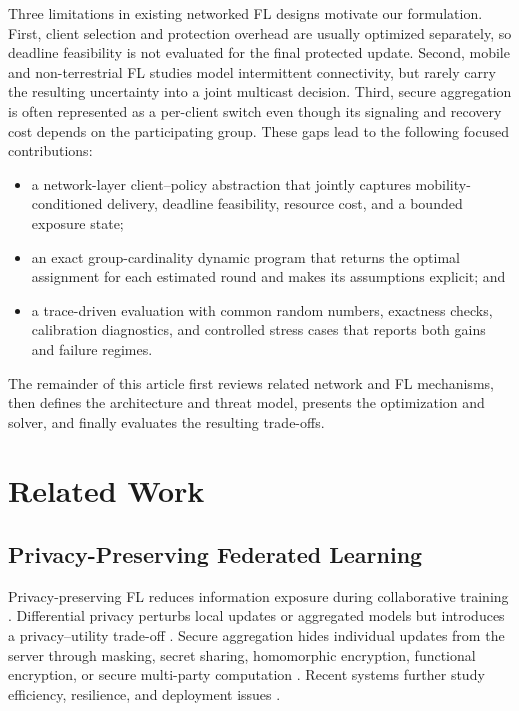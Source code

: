 \documentclass[preprint,12pt]{elsarticle}
\begin{document}
Three limitations in existing networked FL designs motivate our formulation. First, client selection and protection overhead are usually optimized separately, so deadline feasibility is not evaluated for the final protected update. Second, mobile and non-terrestrial FL studies model intermittent connectivity, but rarely carry the resulting uncertainty into a joint multicast decision. Third, secure aggregation is often represented as a per-client switch even though its signaling and recovery cost depends on the participating group. These gaps lead to the following focused contributions:
\begin{itemize}
    \item a network-layer client--policy abstraction that jointly captures mobility-conditioned delivery, deadline feasibility, resource cost, and a bounded exposure state;
    \item an exact group-cardinality dynamic program that returns the optimal assignment for each estimated round and makes its assumptions explicit; and
    \item a trace-driven evaluation with common random numbers, exactness checks, calibration diagnostics, and controlled stress cases that reports both gains and failure regimes.
\end{itemize}
The remainder of this article first reviews related network and FL mechanisms, then defines the architecture and threat model, presents the optimization and solver, and finally evaluates the resulting trade-offs.

\section{Related Work}

\subsection{Privacy-Preserving Federated Learning}

Privacy-preserving FL reduces information exposure during collaborative training \cite{zhao2025federation,kairouz2021advances}. Differential privacy perturbs local updates or aggregated models but introduces a privacy--utility trade-off \cite{wei2023pfl_dp,yuan2023amplitude,yuan2023privacyresource}. Secure aggregation hides individual updates from the server through masking, secret sharing, homomorphic encryption, functional encryption, or secure multi-party computation \cite{bonawitz2017secureagg,mansouri2023sok}. Recent systems further study efficiency, resilience, and deployment issues \cite{zheng2023aggregation}.
\end{document}
